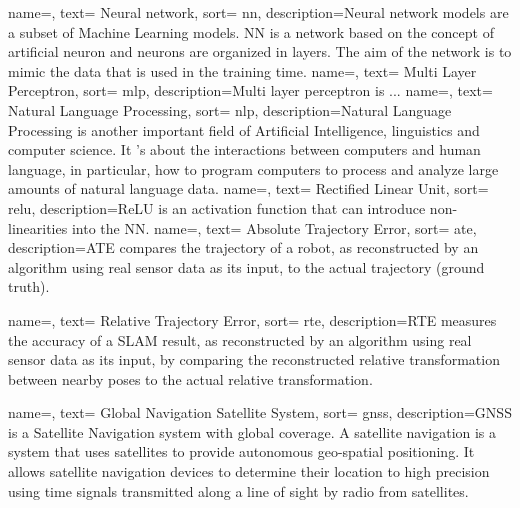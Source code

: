{
    name=,
    text= Neural network,
    sort= nn,
    description={Neural network models are a subset of Machine Learning models. NN is a network based on the concept of artificial neuron and neurons are organized in layers. The aim of the network is to mimic the data that is used in the training time. }
}
{
    name=,
    text= Multi Layer Perceptron,
    sort= mlp,
    description={Multi layer perceptron is ...}
}
{
    name=,
    text= Natural Language Processing,
    sort= nlp,
    description={Natural Language Processing is another important field of Artificial Intelligence, linguistics and computer science. It 's about the interactions between computers and human language, in particular, how to program computers to process and analyze large amounts of natural language data.}
}
{
    name=,
    text= Rectified Linear Unit,
    sort= relu,
    description={ReLU is an activation function that can introduce non-linearities into the NN.}
}
{
    name=,
    text= Absolute Trajectory Error,
    sort= ate,
    description={ATE compares the trajectory of a robot, as reconstructed by an algorithm using real sensor data as its input, to the actual trajectory (ground truth).}
}

{
    name=,
    text= Relative Trajectory Error,
    sort= rte,
    description={RTE measures the accuracy of a SLAM result, as reconstructed by an algorithm using real sensor data as its input, by comparing the reconstructed relative transformation between nearby poses to the actual relative transformation.}
}

{
    name=,
    text= Global Navigation Satellite System,
    sort= gnss,
    description={GNSS is a Satellite Navigation system with global coverage. A satellite navigation is a system that uses satellites to provide autonomous geo-spatial positioning. It allows satellite navigation devices to determine their location to high precision using time signals transmitted along a line of sight by radio from satellites.}
}

